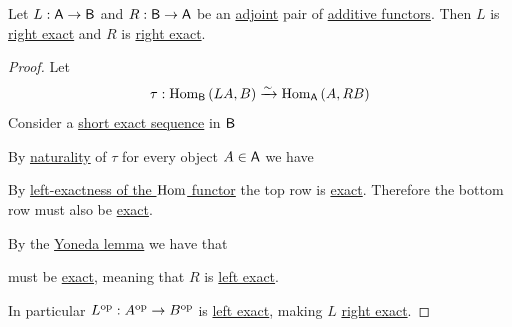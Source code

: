 \documentclass[../../../main]{subfiles}
\begin{document}
\begin{theorem} \label{thm:adjointness-and-exactness}
  Let \(L: \mathsf{A} \to \mathsf{B}\) and \(R: \mathsf{B} \to \mathsf{A}\) be an \hyperref[def:adjoint-functors]{adjoint} pair of \hyperref[def:additive-functor]{additive functors}.
  Then \(L\) is \hyperref[def:exact-complex-functor]{right exact} and \(R\) is \hyperref[def:exact-complex-functor]{right exact}.
\end{theorem}
\begin{proof}
  Let
  \begin{equation*}
    \tau: \operatorname{Hom}_{\mathsf{B}} \left( LA, B \right) \xrightarrow{\sim} \operatorname{Hom}_{\mathsf{A}} \left( A, RB \right)
  \end{equation*}
  Consider a \hyperref[def:short-exact-sequence]{short exact sequence} in \(\mathsf{B}\)
  \begin{center}
  \end{center}
  By \hyperref[def:natural-transformation]{naturality} of \(\tau\) for every object \(A \in \mathsf{A}\) we have
  \begin{center}
  \end{center}

  By \hyperref[ex:hom-left-exact]{left-exactness of the \(\operatorname{Hom}\) functor} the top row is \hyperref[def:short-exact-sequence]{exact}.
  Therefore the bottom row must also be \hyperref[def:short-exact-sequence]{exact}.

  By the \hyperref[lemma:yoneda]{Yoneda lemma} we have that
  \begin{center}
  \end{center}
  must be \hyperref[def:short-exact-sequence]{exact}, meaning that \(R\) is \hyperref[def:exact-complex-functor]{left exact}.

  In particular \(L^{\operatorname*{op}}: A^{\operatorname*{op}} \to B^{\operatorname*{op}}\) is \hyperref[def:exact-complex-functor]{left exact}, making \(L\) \hyperref[def:exact-complex-functor]{right exact}.
\end{proof}
\end{document}
